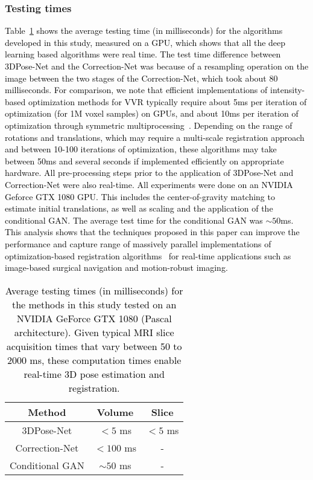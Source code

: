 \documentclass[journal,transmag]{IEEEtran}
\begin{document}
\subsubsection{Testing times}
\label{sec:testtimes}
\textcolor{black}{Table~\ref{table:Time} shows the average testing time (in milliseconds) for the algorithms developed in this study, measured on a GPU, which shows that all the deep learning based algorithms were real time. The test time difference between 3DPose-Net and the Correction-Net was because of a resampling operation on the image between the two stages of the Correction-Net, which took about 80 milliseconds. For comparison, we note that efficient implementations of intensity-based optimization methods for VVR typically require about 5ms per iteration of optimization (for 1M voxel samples) on GPUs, and about 10ms per iteration of optimization through symmetric multiprocessing~\cite{shams2010survey}. Depending on the range of rotations and translations, which may require a multi-scale registration approach and between 10-100 iterations of optimization, these algorithms may take between 50ms and several seconds if implemented efficiently on appropriate hardware. All pre-processing steps prior to the application of 3DPose-Net and Correction-Net were also real-time. \textcolor{black}{All experiments were done on an NVIDIA Geforce GTX 1080 GPU}. This includes the center-of-gravity matching to estimate initial translations, as well as scaling and the application of the conditional GAN. The average test time for the conditional GAN was $\sim50$ms. This analysis shows that the techniques proposed in this paper can improve the performance and capture range of massively parallel implementations of optimization-based registration algorithms~\cite{shams2010survey} for real-time applications such as image-based surgical navigation and motion-robust imaging.}

\begin{table}[h!]
\small
\centering
 \begin{tabular}{|c||c|c|} 
 \hline
Method & Volume & Slice \\
 \hline
3DPose-Net & $<5$ ms & $<5$ ms \\
 \hline
Correction-Net & $<100$ ms & - \\ 
 \hline
Conditional GAN & $\sim50$ ms & - \\
 \hline
\end{tabular}
\caption{\textcolor{black}{Average testing times (in milliseconds) for the methods in this study tested on an NVIDIA GeForce GTX 1080 (Pascal architecture). Given typical MRI slice acquisition times that vary between 50 to 2000 ms, these computation times enable real-time 3D pose estimation and registration.}}
\label{table:Time}
\end{table}
\end{document}
